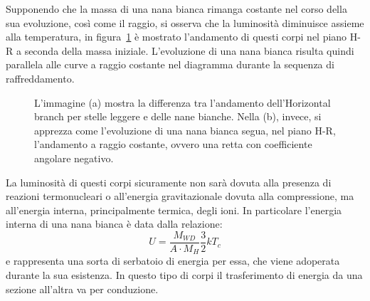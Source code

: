 Supponendo che la massa di una nana bianca rimanga costante nel corso della sua evoluzione, così come il raggio, si osserva che la luminosità diminuisce assieme alla temperatura, in figura~\ref{fig:WD} è mostrato l'andamento di questi corpi nel piano H-R a seconda della massa iniziale. L'evoluzione di una nana bianca risulta quindi parallela alle curve a raggio costante nel diagramma durante la sequenza di raffreddamento.
\begin{figure}
    \centering
     \qquad
    \caption{L'immagine (a) mostra la differenza tra l'andamento dell'Horizontal branch per stelle leggere e delle nane bianche. Nella (b), invece, si apprezza come l'evoluzione di una nana bianca segua, nel piano H-R, l'andamento a raggio costante, ovvero una retta con coefficiente angolare negativo.}\label{fig:WD}
\end{figure}

La luminosità di questi corpi sicuramente non sarà dovuta alla presenza di reazioni termonucleari o all'energia gravitazionale dovuta alla compressione, ma all'energia interna, principalmente termica, degli ioni. In particolare l'energia interna di una nana bianca è data dalla relazione:
\[
    U = \frac{M_{WD}}{A \cdot M_{H}} \frac{3}{2} k T_c
\]
e rappresenta una sorta di serbatoio di energia per essa, che viene adoperata durante la sua esistenza. In questo tipo di corpi il trasferimento di energia da una sezione all'altra va per conduzione.

